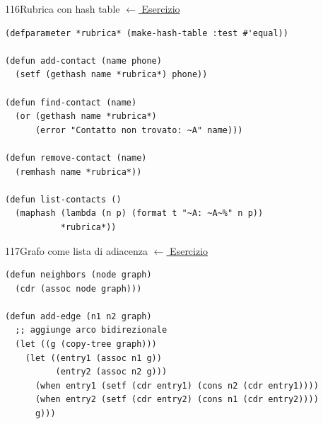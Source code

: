 \label{sol:116}
\begin{solbox}{116}{Rubrica con hash table}
\small\color{black!55}\hyperref[ex:116]{$\leftarrow$ Esercizio}\normalsize\color{black}
\begin{lstlisting}
(defparameter *rubrica* (make-hash-table :test #'equal))

(defun add-contact (name phone)
  (setf (gethash name *rubrica*) phone))

(defun find-contact (name)
  (or (gethash name *rubrica*)
      (error "Contatto non trovato: ~A" name)))

(defun remove-contact (name)
  (remhash name *rubrica*))

(defun list-contacts ()
  (maphash (lambda (n p) (format t "~A: ~A~%" n p))
           *rubrica*))
\end{lstlisting}
\end{solbox}

\label{sol:117}
\begin{solbox}{117}{Grafo come lista di adiacenza}
\small\color{black!55}\hyperref[ex:117]{$\leftarrow$ Esercizio}\normalsize\color{black}
\begin{lstlisting}
(defun neighbors (node graph)
  (cdr (assoc node graph)))

(defun add-edge (n1 n2 graph)
  ;; aggiunge arco bidirezionale
  (let ((g (copy-tree graph)))
    (let ((entry1 (assoc n1 g))
          (entry2 (assoc n2 g)))
      (when entry1 (setf (cdr entry1) (cons n2 (cdr entry1))))
      (when entry2 (setf (cdr entry2) (cons n1 (cdr entry2))))
      g)))
\end{lstlisting}
\end{solbox}


